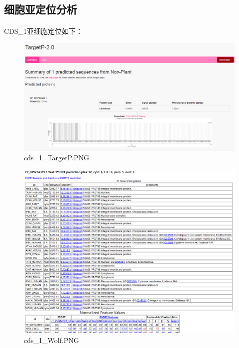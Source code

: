 \documentclass[supercite]{HustGraduPaper}
\begin{document}
	\subsection{细胞亚定位分析}
	\paragraph{}\label{subpara:subpara}CDS\_1亚细胞定位如下：
	\begin{figure}[H]
		\centering
		\includegraphics[width=1\textwidth]{./material/practice2/cds_1/TargetP.png}
		\caption{cds\_1\_TargetP.PNG}
	\end{figure}
	\begin{figure}[H]
		\centering
		\includegraphics[width=1\textwidth]{./material/practice2/cds_1/wolf.png}
		\caption{cds\_1\_Wolf.PNG}
	\end{figure}
\end{document}
